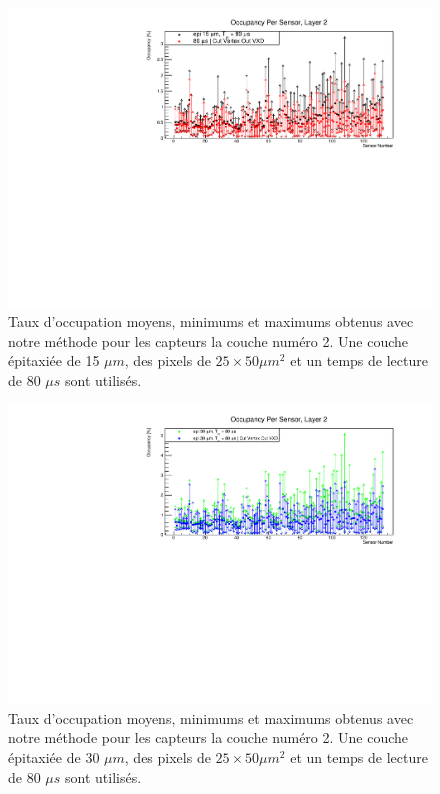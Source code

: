 \begin{appendices}
  \begin{figure}[!htb]
    \begin{center}
      \includegraphics[scale=0.80]{./figures/sensors_Readout_Time/resultOccupancyPerSensor/occupancyPerSensor_Layer2_epi_15um_Min_Max.pdf}
      \caption{Taux d'occupation moyens, minimums et maximums obtenus avec notre m\'ethode pour les capteurs la couche num\'ero 2. Une couche \'epitaxi\'ee de 15 $\mu m$, des pixels de $25 \times 50 \mu m^2$ et un temps de lecture de 80 $\mu s$ sont utilis\'es.}
      \label{fig:OccupancyLayer2_epi15um_Min_Max}
    \end{center}
  \end{figure}
  
  \begin{figure}[!htb]
    \begin{center}
      \includegraphics[scale=0.80]{./figures/sensors_Readout_Time/resultOccupancyPerSensor/occupancyPerSensor_Layer2_epi_30um_Min_Max.pdf}
      \caption{Taux d'occupation moyens, minimums et maximums obtenus avec notre m\'ethode pour les capteurs la couche num\'ero 2. Une couche \'epitaxi\'ee de 30 $\mu m$, des pixels de $25 \times 50 \mu m^2$ et un temps de lecture de 80 $\mu s$ sont utilis\'es.}
      \label{fig:OccupancyLayer2_epi30um_Min_Max}
    \end{center}
  \end{figure}
  

\end{appendices}
